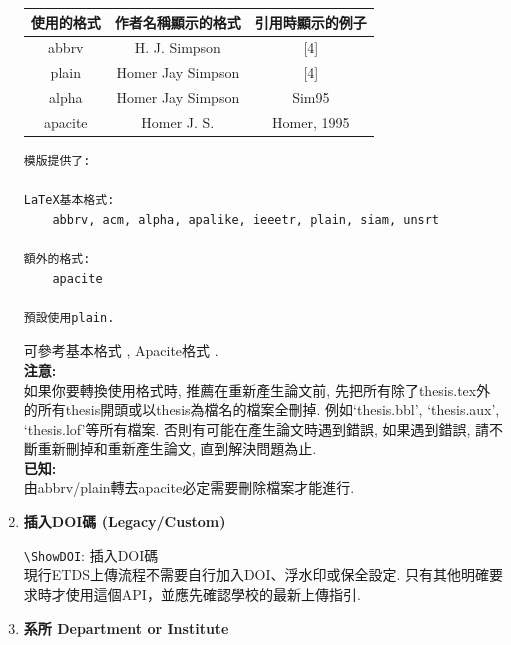 \begin{enumerate}
{  \InsertTable
    {
        \begin{tabular}{|c|c|c|}
        \hline
        使用的格式   & 作者名稱顯示的格式         & 引用時顯示的例子    \\ \hline
        abbrv   & H. J. Simpson     & {[}4{]}     \\ \hline
        plain   & Homer Jay Simpson & {[}4{]}     \\ \hline
        alpha   & Homer Jay Simpson & Sim95       \\ \hline
        apacite & Homer J. S.       & Homer, 1995 \\ \hline
        \end{tabular}
    }

    \begin{DescriptionFrame}
    \begin{verbatim}
模版提供了:

LaTeX基本格式:
    abbrv, acm, alpha, apalike, ieeetr, plain, siam, unsrt

額外的格式:
    apacite

預設使用plain.
    \end{verbatim}
    \end{DescriptionFrame}

   可參考基本格式 , Apacite格式 .\\

 \textbf{注意:}\\
如果你要轉換使用格式時, 推薦在重新產生論文前, 先把所有除了thesis.tex外的所有thesis開頭或以thesis為檔名的檔案全刪掉. 例如`thesis.bbl', `thesis.aux', `thesis.lof'等所有檔案.  否則有可能在產生論文時遇到錯誤, 如果遇到錯誤, 請不斷重新刪掉和重新產生論文, 直到解決問題為止.\\

 \textbf{已知:}\\
由abbrv/plain轉去apacite必定需要刪除檔案才能進行.
  } %

  \newpage
  \item
  {
    \textbf{插入DOI碼 (Legacy/Custom)}

    \verb|\ShowDOI|:  插入DOI碼\\
    現行ETDS上傳流程不需要自行加入DOI、浮水印或保全設定. 只有其他明確要求時才使用這個API，並應先確認學校的最新上傳指引.
  } %

  \newpage
  \item
  {
    \textbf{系所 Department or Institute}

}
\end{enumerate}
